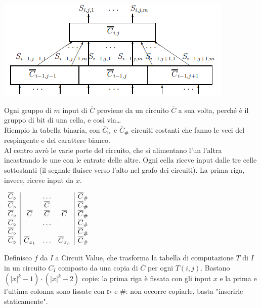 \documentclass[10pt]{book}
\begin{document}
\begin{center}
	\includegraphics[scale=0.75]{4.png}
\end{center}
Ogni gruppo di $m$ input di $\overline{C}$ proviene da un circuito $\overline{C}$ a sua volta, perché è il gruppo di bit di una cella, e così via\ldots\\
Riempio la tabella binaria, con $\overline{C}_\triangleright$ e $\overline{C}_\#$ circuiti costanti che fanno le veci del respingente e del carattere bianco.\\
Al centro avrò le varie porte del circuito, che si alimentano l'un l'altra incastrando le une con le entrate delle altre. Ogni cella riceve input dalle tre celle sottostanti (il segnale fluisce verso l'alto nel grafo dei circuiti). La prima riga, invece, riceve input da $x$.
\begin{center}
	\begin{math}
		\begin{array}{c | c c c | c}
			\overline{C}_\triangleright & &\ldots & & \overline{C}_\#\\
			\overline{C}_\triangleright & & \overline{C} & & \overline{C}_\#\\
			\overline{C}_\triangleright & \overline{C} & \overline{C} & \overline{C} & \overline{C}_\#\\
			\overline{C}_\triangleright & &\ldots & & \overline{C}_\#\\
			\overline{C}_\triangleright & & & & \overline{C}_\#\\
			\overline{C}_\triangleright & \overline{C}_{x_1} & \ldots & \overline{C}_{x_n} & \overline{C}_\#\\
		\end{array}
	\end{math}
\end{center}
Definisco $f$ da $I$ a Circuit Value, che trasforma la tabella di computazione $T$ di $I$ in un circuito $C_I$ composto da una copia di $\overline{C}$ per ogni $T(i,j)$. Bastano $(|x|^k - 1) \cdot (|x|^k - 2)$ copie: la prima riga è fissata con gli input $x$ e la prima e l'ultima colonna sono fissate con $\triangleright$ e $\#$: non occorre copiarle, basta "inserirle staticamente".\\
\end{document}
